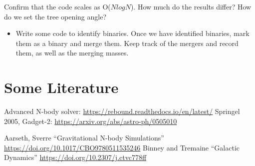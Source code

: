 \documentclass[12pt]{article}
\begin{document}
Confirm that the code scales as O($N log N$). How much do the results differ? How do we set the tree opening angle?

\begin{itemize}
\item Write some code to identify binaries. Once we have identified binaries, mark them as a binary and merge them. Keep track of the mergers and record them, as well as the merging masses.
\end{itemize}


\section{Some Literature}
Advanced N-body solver: \url{https://rebound.readthedocs.io/en/latest/}
Springel 2005, Gadget-2: \url{https://arxiv.org/abs/astro-ph/0505010}

Aarseth, Sverre ``Gravitational N-body Simulations'' \url{https://doi.org/10.1017/CBO9780511535246}
Binney and Tremaine ``Galactic Dynamics'' \url{https://doi.org/10.2307/j.ctvc778ff}
\end{document}
